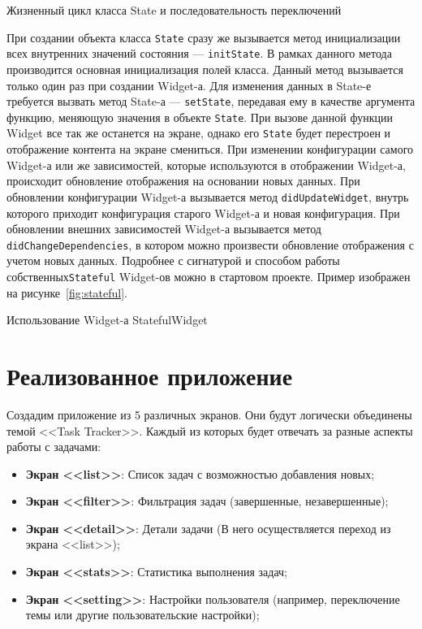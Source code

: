 \begin{image}
	\caption{Жизненный цикл класса State и последовательность переключений}
	\label{fig:state:life}
\end{image}

При создании объекта класса \texttt{State}
сразу же вызывается метод инициализации
всех внутренних значений состояния --- \texttt{initState}.
В рамках данного метода производится основная инициализация полей класса.
Данный метод вызывается только один раз при создании Widget-а.
Для изменения данных в State-е требуется вызвать
метод State-а --- \texttt{setState},
передавая ему в качестве аргумента функцию,
меняющую значения в объекте \texttt{State}.
При вызове данной функции Widget все так же останется на экране,
однако его \texttt{State} будет перестроен
и отображение контента на экране смениться.
При изменении конфигурации самого Widget-а
или же зависимостей, которые используются в отображении Widget-а,
происходит обновление отображения на основании новых данных.
При обновлении конфигурации Widget-а вызывается метод \texttt{didUpdateWidget},
внутрь которого приходит конфигурация старого Widget-а и новая конфигурация.
При обновлении внешних зависимостей Widget-а
вызывается метод \texttt{didChangeDependencies},
в котором можно произвести обновление отображения с учетом новых данных.
Подробнее с сигнатурой и способом работы собственных\texttt{Stateful} 
Widget-ов можно в стартовом проекте.
Пример изображен на рисунке~\ref{fig:stateful}.

\begin{image}
	\caption{Использование Widget-а StatefulWidget}
	\label{fig:stateful}
\end{image}

\clearpage

\section{Реализованное приложение}

Создадим приложение из 5 различных экранов.
Они будут логически объединены темой <<Task Tracker>>.
Каждый из которых будет отвечать за разные аспекты работы с задачами:

\begin{itemize}
	\item \textbf{Экран <<list>>}:
		Список задач с возможностью добавления новых;
	\item \textbf{Экран <<filter>>}:
		Фильтрация задач (завершенные, незавершенные);
	\item \textbf{Экран <<detail>>}:
		Детали задачи (В него осуществляется переход из экрана <<list>>);
	\item \textbf{Экран <<stats>>}: Статистика выполнения задач;
	\item \textbf{Экран <<setting>>}:
		Настройки пользователя
		(например, переключение темы или другие пользовательские настройки);
\end{itemize}

